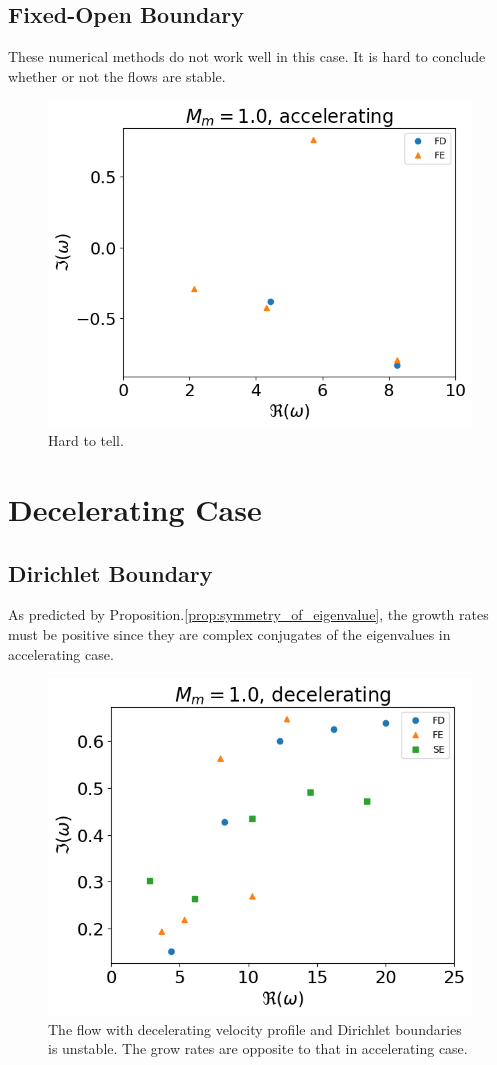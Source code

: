 \subsection{Fixed-Open Boundary}
These numerical methods do not work well in this case. It is hard to conclude whether or not the flows are stable.
\begin{figure} [H]
	\centering
	\includegraphics[width=0.7\linewidth]{img/numerical_experiments/fixed_open/accelerating_v}
	\caption{Hard to tell.}
	\label{fig:accelerating_v_fixed_open}
\end{figure}


\section{Decelerating Case}
\subsection{Dirichlet Boundary}
As predicted by Proposition.\ref{prop:symmetry_of_eigenvalue}, the growth rates must be positive since they are complex conjugates of the eigenvalues in accelerating case.

\begin{figure} [H]
	\centering
	\includegraphics[width=0.7\linewidth]{img/numerical_experiments/fixed_fixed/decelerating_v}
	\caption{The flow with decelerating velocity profile and Dirichlet boundaries is unstable. The grow rates are opposite to that in accelerating case.}
	\label{fig:decelerating_v_dirichlet}
\end{figure}

